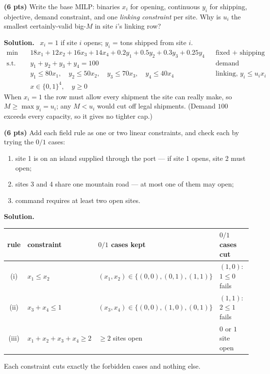 \documentclass[10pt]{article}
\newenvironment{solution}
  {\par\smallskip\begingroup\color{solink}\textbf{Solution.}\ }
  {\endgroup\par}
\begin{document}
\begin{parts}
\item \textbf{(6 pts)} Write the base MILP: binaries $x_i$ for opening, continuous
  $y_i$ for shipping, objective, demand constraint, and one \emph{linking constraint}
  per site. Why is $u_i$ the smallest certainly-valid big-$M$ in site $i$'s linking
  row?

\begin{solution}
$x_i = 1$ if site $i$ opens; $y_i$ = tons shipped from site $i$.
\[
\begin{aligned}
  \min\quad & 18x_1 + 12x_2 + 16x_3 + 14x_4 + 0.2y_1 + 0.5y_2 + 0.3y_3 + 0.25y_4
    && \text{fixed + shipping (\$k)} \\
  \text{s.t.}\quad & y_1 + y_2 + y_3 + y_4 = 100 && \text{demand} \\
  & y_1 \le 80x_1, \quad y_2 \le 50x_2, \quad y_3 \le 70x_3, \quad y_4 \le 40x_4
    && \text{linking, } y_i \le u_i x_i \\
  & x \in \{0,1\}^4, \quad y \ge 0
\end{aligned}
\]
When $x_i = 1$ the row must allow every shipment the site can really make, so
$M \ge \max y_i = u_i$; any $M < u_i$ would cut off legal shipments. (Demand $100$
exceeds every capacity, so it gives no tighter cap.)
\end{solution}

\item \textbf{(6 pts)} Add each field rule as one or two linear constraints, and
  check each by trying the $0/1$ cases:
  \begin{enumerate}[label=(\roman*), leftmargin=2.2em, itemsep=2pt]
    \item site 1 is on an island supplied through the port --- if site 1 opens,
      site 2 must open;
    \item sites 3 and 4 share one mountain road --- at most one of them may open;
    \item command requires at least two open sites.
  \end{enumerate}

\begin{solution}
\begin{center}
\begin{tabular}{c|l|l|l}
 rule & constraint & $0/1$ cases kept & $0/1$ cases cut \\ \hline
 (i)   & $x_1 \le x_2$           & $(x_1,x_2) \in \{(0,0),(0,1),(1,1)\}$ & $(1,0)$: $1 \le 0$ fails \\
 (ii)  & $x_3 + x_4 \le 1$       & $(x_3,x_4) \in \{(0,0),(1,0),(0,1)\}$ & $(1,1)$: $2 \le 1$ fails \\
 (iii) & $x_1 + x_2 + x_3 + x_4 \ge 2$ & $\ge 2$ sites open & $0$ or $1$ site open
\end{tabular}
\end{center}
Each constraint cuts exactly the forbidden cases and nothing else.
\end{solution}


\end{parts}
\end{document}
